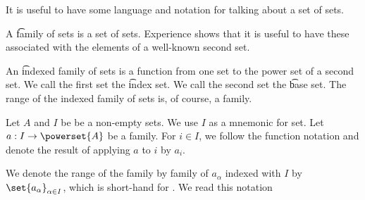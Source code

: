 
\sbasic











\sstart
{}


It is useful to
have some language and
notation for talking about
a set of sets.


A \t{family} of sets
is a set of sets.
Experience shows that it is
useful to have these associated
with the elements of a well-known
second set.

An \t{indexed family of sets} is a function
from one set to the power set of a second set.
We call the first set the \t{index set}.
We call the second set the \t{base set}.
The range of the indexed family of sets is, of course, a family.




Let $A$ and $I$ be be a non-empty sets.
We use $I$ as a mnemonic for 
set.
Let $a: I \to \powerset{A}$ be a family.
For $i \in I$, we follow the function notation
and denote the result of applying $a$ to $i$ by
$a_{i}$.

We denote the range of the family by
family of $a_{\alpha}$ indexed with $I$
by $\set{a_{\alpha}}_{\alpha \in I}$, which is short-hand
for .
We read this notation 

\strats
